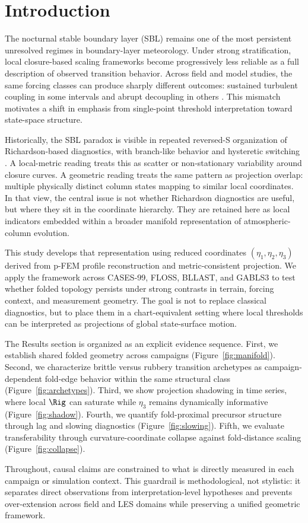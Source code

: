 \section{Introduction}

The nocturnal stable boundary layer (SBL) remains one of the most persistent unresolved regimes in boundary-layer meteorology. Under strong stratification, local closure-based scaling frameworks become progressively less reliable as a full description of observed transition behavior. Across field and model studies, the same forcing classes can produce sharply different outcomes: sustained turbulent coupling in some intervals and abrupt decoupling in others \citep{mcnider1993, mcnider1995, vandewiel2017, vignon2017}. This mismatch motivates a shift in emphasis from single-point threshold interpretation toward state-space structure.

Historically, the SBL paradox is visible in repeated reversed-S organization of Richardson-based diagnostics, with branch-like behavior and hysteretic switching \citep{mcnider1993, mcnider1995}. A local-metric reading treats this as scatter or non-stationary variability around closure curves. A geometric reading treats the same pattern as projection overlap: multiple physically distinct column states mapping to similar local coordinates. In that view, the central issue is not whether Richardson diagnostics are useful, but where they sit in the coordinate hierarchy. They are retained here as local indicators embedded within a broader manifold representation of atmospheric-column evolution.

This study develops that representation using reduced coordinates $(\eta_1,\eta_2,\eta_3)$ derived from p-FEM profile reconstruction and metric-consistent projection. We apply the framework across CASES-99, FLOSS, BLLAST, and GABLS3 to test whether folded topology persists under strong contrasts in terrain, forcing context, and measurement geometry. The goal is not to replace classical diagnostics, but to place them in a chart-equivalent setting where local thresholds can be interpreted as projections of global state-surface motion.

The Results section is organized as an explicit evidence sequence. First, we establish shared folded geometry across campaigns (Figure~\ref{fig:manifold}). Second, we characterize brittle versus rubbery transition archetypes as campaign-dependent fold-edge behavior within the same structural class (Figure~\ref{fig:archetypes}). Third, we show projection shadowing in time series, where local $\Rig$ can saturate while $\eta_3$ remains dynamically informative (Figure~\ref{fig:shadow}). Fourth, we quantify fold-proximal precursor structure through lag and slowing diagnostics (Figure~\ref{fig:slowing}). Fifth, we evaluate transferability through curvature-coordinate collapse against fold-distance scaling (Figure~\ref{fig:collapse}).

Throughout, causal claims are constrained to what is directly measured in each campaign or simulation context. This guardrail is methodological, not stylistic: it separates direct observations from interpretation-level hypotheses and prevents over-extension across field and LES domains while preserving a unified geometric framework.
